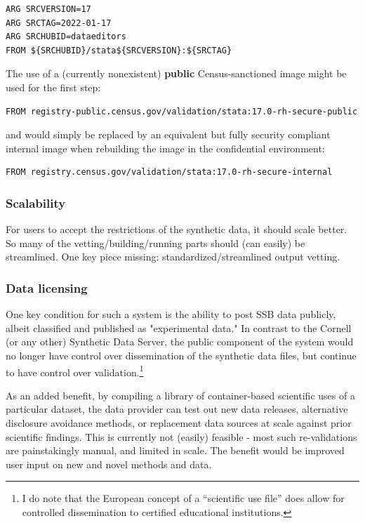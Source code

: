 \documentclass[]{hdsr}
\begin{document}
\begin{lstlisting}[language=docker]
ARG SRCVERSION=17
ARG SRCTAG=2022-01-17
ARG SRCHUBID=dataeditors
FROM ${SRCHUBID}/stata${SRCVERSION}:${SRCTAG}
\end{lstlisting}

The use of a  (currently nonexistent) \textbf{public}  Census-sanctioned image might be used for the first step:

\begin{lstlisting}[language=docker]
FROM registry-public.census.gov/validation/stata:17.0-rh-secure-public
\end{lstlisting}

and would simply be replaced by an equivalent but fully security compliant internal image when rebuilding the image in the confidential environment:

\begin{lstlisting}[language=docker]
FROM registry.census.gov/validation/stata:17.0-rh-secure-internal
\end{lstlisting}



\subsubsection{Scalability}

For users to accept the restrictions of the synthetic data, it should scale better. So many of the vetting/building/running parts should (can easily) be streamlined. One key piece missing: standardized/streamlined output vetting.

\subsubsection{Data licensing}

One key condition for such a system is the ability to post SSB data publicly, albeit  classified and published as "experimental data." In contrast to the Cornell (or any other) Synthetic Data Server, the public component of the system would no longer have control over dissemination of the synthetic data files, but continue to have control over validation.\footnote{I do note that the European concept of a ``scientific use file'' does allow for controlled dissemination to certified educational institutions.}

As an added benefit, by compiling a library of container-based scientific uses of a particular dataset, the data provider can test out new data releases, alternative disclosure avoidance methods, or replacement data sources  at scale against prior scientific findings. This is currently not (easily) feasible - most such re-validations are painstakingly manual, and limited in scale. The benefit would be improved user input on new and novel methods and data.
\end{document}
